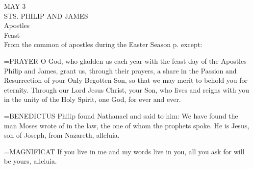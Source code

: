 \begin{center}\normalsize MAY 3\\
\footnotesize STS. PHILIP AND JAMES\\
\footnotesize Apostles\\
\footnotesize Feast\\
\footnotesize From the common of apostles during the Easter Season p.    except:\\
\end{center}

\hangindent=\parindent \small{PRAYER 
O God, who gladden us each year
with the feast day of the Apostles Philip and James,
grant us, through their prayers,
a share in the Passion and Resurrection
of your Only Begotten Son,
so that we may merit to behold you for eternity.
Through our Lord Jesus Christ, your Son,
who lives and reigns with you in the unity of the Holy Spirit,
one God, for ever and ever.\\}
 
\hangindent=\parindent \small{BENEDICTUS  Philip found Nathanael and said to him: We have found
the man Moses wrote of in the law, the one of whom the prophets
spoke. He is Jesus, son of Joseph, from Nazareth, alleluia.\\}
 
\hangindent=\parindent \small{MAGNIFICAT  If you live in me and my words live in you, all you ask
for will be yours, alleluia.\\}
 


